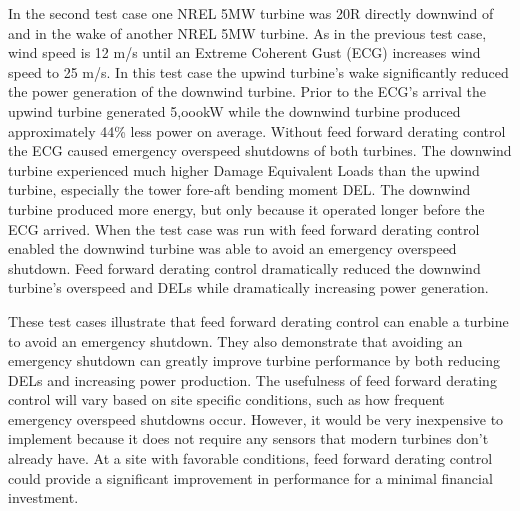In the second test case one NREL 5MW turbine was 20R directly downwind of and in the wake of another NREL 5MW turbine. As in the previous test case, wind speed is 12 m/s until an Extreme Coherent Gust (ECG) increases wind speed to 25 m/s. In this test case the upwind turbine's wake significantly reduced the power generation of the downwind turbine. Prior to the ECG's arrival the upwind turbine generated 5,oookW while the downwind turbine produced approximately 44\% less power on average. Without feed forward derating control the ECG caused emergency overspeed shutdowns of both turbines. The downwind turbine experienced much higher Damage Equivalent Loads than the upwind turbine, especially the tower fore-aft bending moment DEL. The downwind turbine produced more energy, but only because it operated longer before the ECG arrived. When the test case was run with feed forward derating control enabled the downwind turbine was able to avoid an emergency overspeed shutdown. Feed forward derating control dramatically reduced the downwind turbine's overspeed and DELs while dramatically increasing power generation.

These test cases illustrate that feed forward derating control can enable a turbine to avoid an emergency shutdown. They also demonstrate that avoiding an emergency shutdown can greatly improve turbine performance by both reducing DELs and increasing power production. The usefulness of feed forward derating control will vary based on site specific conditions, such as how frequent emergency overspeed shutdowns occur. However, it would be very inexpensive to implement because it does not require any sensors that modern turbines don't already have. At a site with favorable conditions, feed forward derating control could provide a significant improvement in performance for a minimal financial investment.